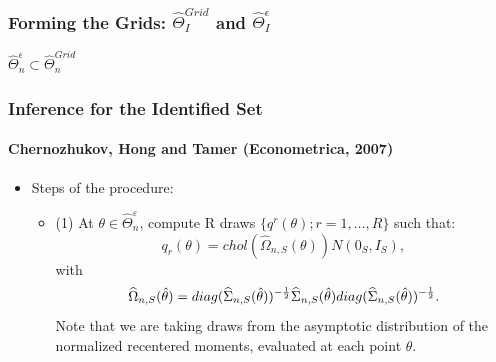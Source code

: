 \documentclass[notes=show]{beamer}
\begin{document}
\begin{frame}
\frametitle{Forming the Grids: $\widehat{\Theta}_{I}^{Grid}$ and
$\widehat{\Theta}_{I}^{\epsilon}$}

$\widehat{\Theta }_{n}^{\epsilon }\subset \widehat{\Theta }_{n}^{Grid}$

\begin{figure}[h!]
\begin{center}
\end{center}
\end{figure}
\end{frame}


\begin{frame}
\frametitle{Inference for the Identified Set}
\framesubtitle{Chernozhukov, Hong and Tamer (Econometrica,
2007)}
\begin{itemize}
\item Steps of the procedure: 

\begin{itemize}
\item (1) At $\theta \in \widehat{\Theta }_{n}^{\varepsilon }$, compute R
draws $\{q^{r}(\theta );r=1,\dots ,R\}$ such that: 
\begin{equation*}
q_{r}(\theta )=chol(\widehat{\Omega }_{n,S}(\theta ))N(0_{S},I_{S}),
\end{equation*}%
with 
\begin{equation*}
\widehat{\Omega }_{n,S}(\hat{\theta})=diag(\widehat{\Sigma }_{n,S}(\hat{%
\theta}))^{-\frac{1}{2}}\widehat{\Sigma }_{n,S}(\hat{\theta})diag(\widehat{%
\Sigma }_{n,S}(\hat{\theta}))^{-\frac{1}{2}}.
\end{equation*}%
Note that we are taking draws from the asymptotic distribution of the
normalized recentered moments, evaluated at each point $\theta $. 
\end{itemize}
\end{itemize}
\end{frame}
\end{document}
